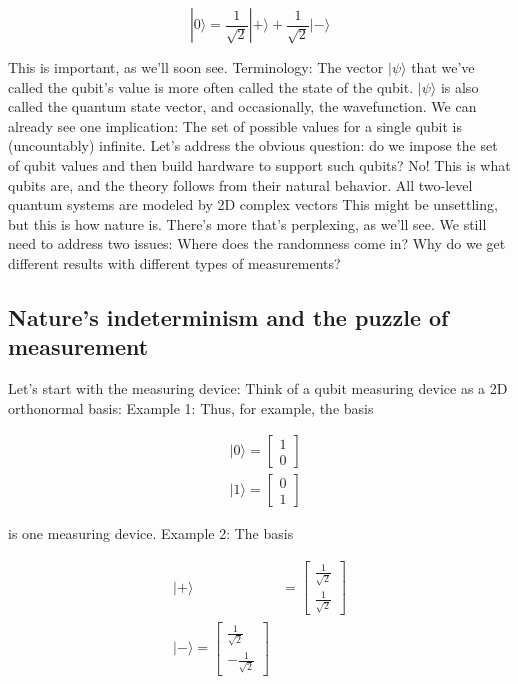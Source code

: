 \documentclass[main.tex]{subfiles}
\begin{document}
    $$
    |0\rangle=\frac{1}{\sqrt{2}}|+\rangle+\frac{1}{\sqrt{2}}|-\rangle
    $$
    
    This is important, as we'll soon see. Terminology: The vector $|\psi\rangle$ that we've called the qubit's value is more often called the state of the qubit. $|\psi\rangle$ is also called the quantum state vector, and occasionally, the wavefunction. We can already see one implication: The set of possible values for a single qubit is (uncountably) infinite. Let's address the obvious question: do we impose the set of qubit values and then build hardware to support such qubits? No! This is what qubits are, and the theory follows from their natural behavior. All two-level quantum systems are modeled by 2D complex vectors This might be unsettling, but this is how nature is. There's more that's perplexing, as we'll see. We still need to address two issues: Where does the randomness come in? Why do we get different results with different types of measurements?
    
\subsection{Nature's indeterminism and the puzzle of measurement}

    Let's start with the measuring device: Think of a qubit measuring device as a 2D orthonormal basis: Example 1: Thus, for example, the basis
    
    $$
    \begin{aligned}
    &|0\rangle=\left[\begin{array}{l}
    1 \\
    0
    \end{array}\right] \\
    &|1\rangle=\left[\begin{array}{l}
    0 \\
    1
    \end{array}\right]
    \end{aligned}
    $$
    
    is one measuring device. Example 2: The basis
    
    $$
    \begin{aligned}
    |+\rangle &=\left[\begin{array}{l}
    \frac{1}{\sqrt{2}} \\
    \frac{1}{\sqrt{2}}
    \end{array}\right] \\
    |-\rangle=\left[\begin{array}{r}
    \frac{1}{\sqrt{2}} \\
    -\frac{1}{\sqrt{2}}
    \end{array}\right]
    \end{aligned}
    $$
    
\end{document}
